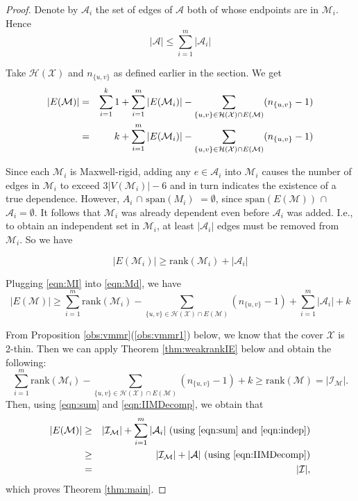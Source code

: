 \documentclass[10pt]{article}
\def\M{\mathcal {M}}
\def\I{\mathcal {I}}
\def\A{\mathcal {A}}
\def\H{\mathcal {H}}
\def\X{\mathcal {X}}
\begin{document}
\begin{proof}
Denote by $\A_i$ the set of edges of $\A$ both of whose endpoints are in $\M_i$. Hence 
\begin{equation}\label{eqn:IIMDecomp}
|\A| \le \sum_{i=1}^m |\A_i|
\end{equation}




Take $\H(\X)$ and $n_{\{u, v\}}$ as defined earlier in the section. We get
\begin{eqnarray}
|E(\M)|& =& \sum_{i=1}^k 1 +\sum_{i=1}^m |E(\M_i)| - \sum\limits_{\{u, v\} \in \H(\X)\cap E(\M)}(n_{\{u, v\}}
-1) \notag\\
&=& k+ \sum_{i=1}^m |E(\M_i)| - \sum\limits_{\{u, v\} \in \H(\X)\cap E(\M)}(n_{\{u, v\}} 
-1) \label{eqn:Md}
\end{eqnarray}

Since each $\M_i$ is Maxwell-rigid, adding any $e\in \A_i$ into $\M_i$ causes the number of edges in $\M_i$ to exceed $3|V(\M_i)|-6$ and in turn indicates the existence of a true dependence. However, $A_i$ $\cap$ $\text{span}(M_i)$ $=\emptyset$, since $\text{span}(E(\M))$ $\cap$ $\A_i= \emptyset$. It follows that $\M_i$ was already dependent even before $\A_i$ was added. I.e., to obtain an independent set in $\M_i$, at least $|\A_i|$ edges must be removed from $\M_i$. So we have

\begin{equation}\label{eqn:MI}
|E(\M_i)| \geq \text{rank}(\M_i) +|\A_i|
\end{equation}

Plugging \eqref{eqn:MI} into \eqref{eqn:Md}, we have 
 \begin{equation}\label{eqn:sum}
 |E(\M)| \geq \sum_{i=1}^m \text{rank}(\M_i)  - \sum_{\{u, v\} \in \H(\X)\cap E(\M)}(n_{\{u, v\}}
 -1) +\sum_{i=1}^m |\A_i| + k
 \end{equation}

From Proposition \ref{obs:vmmr}(\ref{obs:vmmr1}) below, we know that the cover $\X$ is 2-thin. Then we can apply Theorem \ref{thm:weakrankIE} below and obtain the following:
 \begin{equation}\label{eqn:indep}
 \sum_{i=1}^m \text{rank}(\M_i) - \sum_{\{u, v\} \in \H(\X)\cap E(\M)}(n_{\{u, v\}}-1) +k \geq \text{rank}(\M)=|\I_{\M}|.
 \end{equation}
Then, using \eqref{eqn:sum} and \eqref{eqn:IIMDecomp}, we obtain that 
\begin{eqnarray*}
|E(\M)|& \geq &|\I_{\M}| +\sum_{i=1}^m |\A_i| \hbox{ (using \eqref{eqn:sum} and \eqref{eqn:indep})}\\
 &\geq &|\I_{\M}| + |\A|  \hbox{ (using \eqref{eqn:IIMDecomp})} \\
 &=&|\I|,
\end{eqnarray*} which proves Theorem \ref{thm:main}. 
\end{proof}
\end{document}
